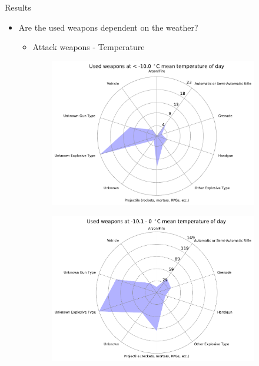 \documentclass{beamer}
\begin{document}
\begin{frame}{Results}
	\begin{itemize}
		\item 
		Are the used weapons dependent on the weather?
		\begin{itemize}
			\item Attack weapons - Temperature
		\end{itemize}
	\end{itemize}
	
	\begin{figure}

		\begin{subfigure}[b]{0.3\textwidth}
			\includegraphics[width=\textwidth]{Temp-Weapon/temp<-100_starDiagram}
		\end{subfigure}
		\begin{subfigure}[b]{0.3\textwidth}
			\includegraphics[width=\textwidth]{Temp-Weapon/temp-101-0_starDiagram}

\end{subfigure}
\end{figure}
\end{frame}
\end{document}
